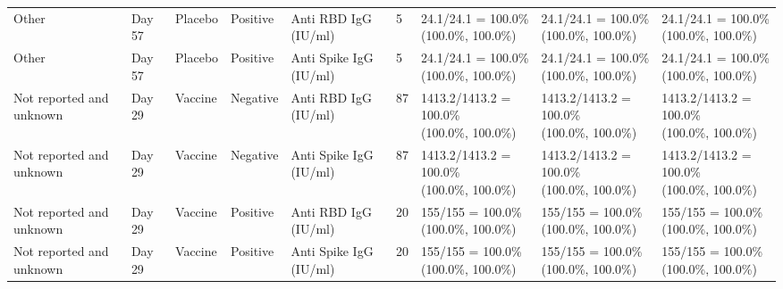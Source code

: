 \documentclass[]{book}
\theoremstyle{definition}
\theoremstyle{definition}
\theoremstyle{definition}
\newcommand{\1}{\mathbbm{1}}
\begin{document}
\begin{landscape}
\begin{ThreePartTable}
\begin{longtable}[t]{>{\raggedright\arraybackslash}p{2.7cm}llllllll}
\hspace{1em}Other & Day 57 & Placebo & Positive & Anti RBD IgG (IU/ml) & 5 & \makecell[l]{24.1/24.1 = 100.0\%\\(100.0\%, 100.0\%)} & \makecell[l]{24.1/24.1 = 100.0\%\\(100.0\%, 100.0\%)} & \makecell[l]{24.1/24.1 = 100.0\%\\(100.0\%, 100.0\%)}\\
\hspace{1em}Other & Day 57 & Placebo & Positive & Anti Spike IgG (IU/ml) & 5 & \makecell[l]{24.1/24.1 = 100.0\%\\(100.0\%, 100.0\%)} & \makecell[l]{24.1/24.1 = 100.0\%\\(100.0\%, 100.0\%)} & \makecell[l]{24.1/24.1 = 100.0\%\\(100.0\%, 100.0\%)}\\
\hspace{1em}Not reported and unknown & Day 29 & Vaccine & Negative & Anti RBD IgG (IU/ml) & 87 & \makecell[l]{1413.2/1413.2 = 100.0\%\\(100.0\%, 100.0\%)} & \makecell[l]{1413.2/1413.2 = 100.0\%\\(100.0\%, 100.0\%)} & \makecell[l]{1413.2/1413.2 = 100.0\%\\(100.0\%, 100.0\%)}\\
\hspace{1em}Not reported and unknown & Day 29 & Vaccine & Negative & Anti Spike IgG (IU/ml) & 87 & \makecell[l]{1413.2/1413.2 = 100.0\%\\(100.0\%, 100.0\%)} & \makecell[l]{1413.2/1413.2 = 100.0\%\\(100.0\%, 100.0\%)} & \makecell[l]{1413.2/1413.2 = 100.0\%\\(100.0\%, 100.0\%)}\\
\hspace{1em}Not reported and unknown & Day 29 & Vaccine & Positive & Anti RBD IgG (IU/ml) & 20 & \makecell[l]{155/155 = 100.0\%\\(100.0\%, 100.0\%)} & \makecell[l]{155/155 = 100.0\%\\(100.0\%, 100.0\%)} & \makecell[l]{155/155 = 100.0\%\\(100.0\%, 100.0\%)}\\
\hspace{1em}Not reported and unknown & Day 29 & Vaccine & Positive & Anti Spike IgG (IU/ml) & 20 & \makecell[l]{155/155 = 100.0\%\\(100.0\%, 100.0\%)} & \makecell[l]{155/155 = 100.0\%\\(100.0\%, 100.0\%)} & \makecell[l]{155/155 = 100.0\%\\(100.0\%, 100.0\%)}\\

\end{longtable}
\end{ThreePartTable}
\end{landscape}
\end{document}
